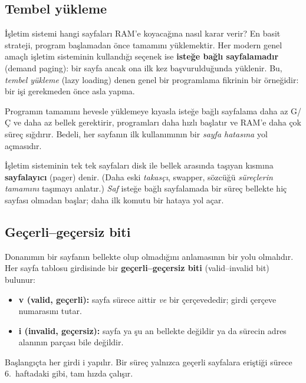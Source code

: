 \documentclass[11pt,a4paper]{article}
\newcommand{\term}[1]{\textbf{\color{mintdeep}#1}}
\begin{document}
\subsection{Tembel yükleme}

İşletim sistemi hangi sayfaları RAM'e koyacağına nasıl karar verir? En basit strateji, program başlamadan önce tamamını yüklemektir. Her modern genel amaçlı işletim sisteminin kullandığı seçenek ise \term{isteğe bağlı sayfalamadır} (demand paging): bir sayfa ancak ona ilk kez başvurulduğunda yüklenir. Bu, \emph{tembel yükleme} (lazy loading) denen genel bir programlama fikrinin bir örneğidir: bir işi gerekmeden önce asla yapma.

Programın tamamını hevesle yüklemeye kıyasla isteğe bağlı sayfalama daha az G/Ç ve daha az bellek gerektirir, programları daha hızlı başlatır ve RAM'e daha çok süreç sığdırır. Bedeli, her sayfanın ilk kullanımının bir \emph{sayfa hatasına} yol açmasıdır.

İşletim sisteminin tek tek sayfaları disk ile bellek arasında taşıyan kısmına \term{sayfalayıcı} (pager) denir. (Daha eski \emph{takasçı}, swapper, sözcüğü \emph{süreçlerin tamamını} taşımayı anlatır.) \emph{Saf} isteğe bağlı sayfalamada bir süreç bellekte hiç sayfası olmadan başlar; daha ilk komutu bir hataya yol açar.

\subsection{Geçerli--geçersiz biti}

Donanımın bir sayfanın bellekte olup olmadığını anlamasının bir yolu olmalıdır. Her sayfa tablosu girdisinde bir \term{geçerli--geçersiz biti} (valid--invalid bit) bulunur:
\begin{itemize}
  \item \textbf{v (valid, geçerli):} sayfa sürece aittir \emph{ve} bir çerçevededir; girdi çerçeve numarasını tutar.
  \item \textbf{i (invalid, geçersiz):} sayfa ya şu an bellekte değildir ya da sürecin adres alanının parçası bile değildir.
\end{itemize}
Başlangıçta her girdi i yapılır. Bir süreç yalnızca geçerli sayfalara eriştiği sürece 6.\ haftadaki gibi, tam hızda çalışır.
\end{document}
